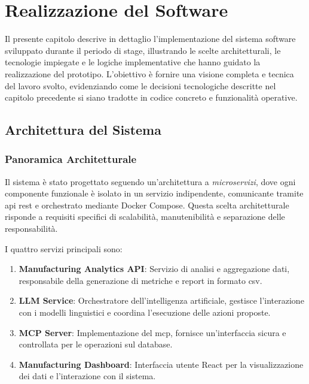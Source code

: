 \chapter{Realizzazione del Software}
\label{ch:realizzazione_software}

Il presente capitolo descrive in dettaglio l'implementazione del sistema software sviluppato durante il periodo di stage, illustrando le scelte architetturali, le tecnologie impiegate e le logiche implementative che hanno guidato la realizzazione del prototipo. L'obiettivo è fornire una visione completa e tecnica del lavoro svolto, evidenziando come le decisioni tecnologiche descritte nel capitolo precedente si siano tradotte in codice concreto e funzionalità operative.

\section{Architettura del Sistema}
\label{sec:system_architecture}

\subsection{Panoramica Architetturale}
Il sistema è stato progettato seguendo un'architettura a \textit{microservizi}, dove ogni componente funzionale è isolato in un servizio indipendente, comunicante tramite \gls{api} \gls{rest} e orchestrato mediante Docker Compose. Questa scelta architetturale risponde a requisiti specifici di scalabilità, manutenibilità e separazione delle responsabilità.


I quattro servizi principali sono:
\begin{enumerate}
    \item \textbf{Manufacturing Analytics API}: Servizio di analisi e aggregazione dati, responsabile della generazione di metriche e report in formato \gls{csv}.
    \item \textbf{LLM Service}: Orchestratore dell'intelligenza artificiale, gestisce l'interazione con i modelli linguistici e coordina l'esecuzione delle azioni proposte.
    \item \textbf{MCP Server}: Implementazione del \gls{mcp}, fornisce un'interfaccia sicura e controllata per le operazioni sul database.
    \item \textbf{Manufacturing Dashboard}: Interfaccia utente React per la visualizzazione dei dati e l'interazione con il sistema.
\end{enumerate}

